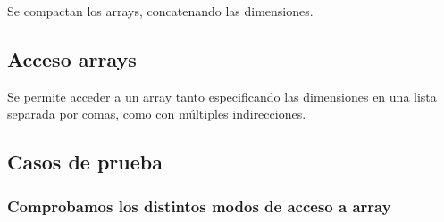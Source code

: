		Se compactan los arrays, concatenando las dimensiones.
		
	\subsection{Acceso arrays}
	
		Se permite acceder a un array tanto especificando las dimensiones en una lista separada por comas, como con múltiples indirecciones.
	
	\subsection{Casos de prueba}
	
		\subsubsection*{Comprobamos los distintos modos de acceso a array}
		
		
		
		